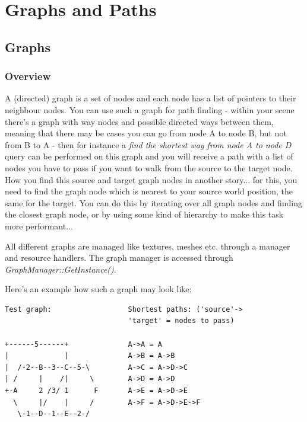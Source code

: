 \section{Graphs and Paths}




\subsection{Graphs}



\subsubsection{Overview}
A (directed) graph is a set of nodes and each node has a list of pointers to their neighbour nodes. You can use such a graph for path finding - within your scene there's a graph with way nodes and possible directed ways between them, meaning that there may be cases you can go from node A to node B, but not from B to A - then for instance a \emph{find the shortest way from node A to node D} query can be performed on this graph and you will receive a path with a list of nodes you have to pass if you want to walk from the source to the target node. How you find this source and target graph nodes in another story... for this, you need to find the graph node which is nearest to your source world position, the same for the target. You can do this by iterating over all graph nodes and finding the closest graph node, or by using some kind of hierarchy to make this task more performant...

All different graphs are managed like textures, meshes etc. through a manager and resource handlers. The graph manager is accessed through \emph{GraphManager::GetInstance()}.

Here's an example how such a graph may look like:

\begin{lstlisting}[caption=Graph example]
Test graph:                  Shortest paths: ('source'->
                             'target' = nodes to pass)

+------5------+              A->A = A
|             |              A->B = A->B
|  /-2--B--3--C--5-\         A->C = A->D->C
| /     |    /|     \        A->D = A->D
+-A     2 /3/ 1      F       A->E = A->D->E
  \     |/    |     /        A->F = A->D->E->F
   \-1--D--1--E--2-/

\end{lstlisting}

